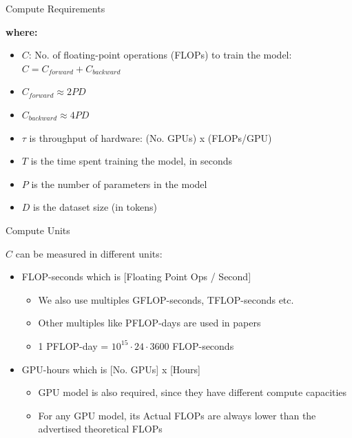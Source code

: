 \begin{vbframe}{Compute Requirements}

\vfill

\textbf{where:}

\begin{itemize}
    \item $C$: No. of floating-point operations (FLOPs) to train the model:\\
          $C = C_{forward} + C_{backward}$
	\item $C_{forward} \approx 2 P D$
	\item $C_{backward} \approx 4 P D$
	\item $\tau$ is throughput of hardware: (No. GPUs) x (FLOPs/GPU)
	\item $T$ is the time spent training the model, in seconds
	\item $P$ is the number of parameters in the model
	\item $D$ is the dataset size (in tokens)
\end{itemize}

\vfill

\end{vbframe}


\begin{vbframe}{Compute Units}

\vfill

$C$  can be measured in different units:\newline

\begin{itemize}
    \item FLOP-seconds which is [Floating Point Ops / Second]
	\begin{itemize}
	    \item We also use multiples GFLOP-seconds, TFLOP-seconds etc.
		\item Other multiples like PFLOP-days are used in papers
		\item 1 PFLOP-day = $10^{15} \cdot 24 \cdot 3600$ FLOP-seconds
	\end{itemize}
	\item GPU-hours which is [No. GPUs] x [Hours]
	\begin{itemize}
	    \item GPU model is also required, since they have different compute capacities
		\item For any GPU model, its Actual FLOPs are always lower than the advertised theoretical FLOPs
	\end{itemize}
\end{itemize}

\vfill

\end{vbframe}

